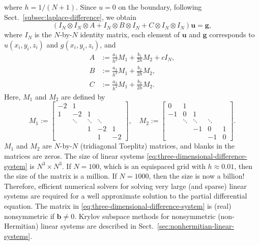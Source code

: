 {where $h=1/(N+1)$. Since $u=0$ on the boundary, following Sect.\ \ref{subsec:laplace-difference}, we obtain}
\begin{equation}\label{eq:three-dimensional-difference-system}
(I_N\otimes I_N\otimes A+I_N\otimes B\otimes I_N+C\otimes I_N\otimes I_N)\boldsymbol{u}=\boldsymbol{g},
\end{equation}
{where $I_N$ is the $N$-by-$N$ identity matrix, each element of $\boldsymbol{u}$ and $\boldsymbol{g}$ corresponds to $u(x_i,y_i,z_i)$ and $g(x_i,y_i,z_i)$, and}
\[\begin{aligned}
A&:=\frac{a_1}{h^2}M_1+\frac{b_1}{2h}M_2+cI_N,\\
B&:=\frac{a_2}{h^2}M_1+\frac{b_2}{2h}M_2,\\
C&:=\frac{a_3}{h^2}M_1+\frac{b_3}{2h}M_2.
\end{aligned}\]
{Here, $M_1$ and $M_2$ are defined by}
\[M_1:=\begin{bmatrix}-2&1&&&\\1&-2&1&&\\&\ddots&\ddots&\ddots&\\&&1&-2&1\\&&&1&-2\end{bmatrix},\quad
M_2:=\begin{bmatrix}0&1&&&\\-1&0&1&&\\&\ddots&\ddots&\ddots&\\&&-1&0&1\\&&&-1&0\end{bmatrix}.\]
{$M_1$ and $M_2$ are $N$-by-$N$ (tridiagonal Toeplitz) matrices, and blanks in the matrices are zeros.}
{The size of linear systems \eqref{eq:three-dimensional-difference-system} is $N^3\times N^3$. If $N=100$, which is an equispaced grid with $h\approx0.01$, then the size of the matrix is a million. If $N=1000$, then the size is now a billion! Therefore, efficient numerical solvers for solving very large (and sparse) linear systems are required for a well approximate solution to the partial differential equation.}
{The matrix in \eqref{eq:three-dimensional-difference-system} is (real) nonsymmetric if $\boldsymbol{b}\ne0$. Krylov subspace methods for nonsymmetric (non-Hermitian) linear systems are described in Sect.\ \ref{sec:nonhermitian-linear-systems}.}
